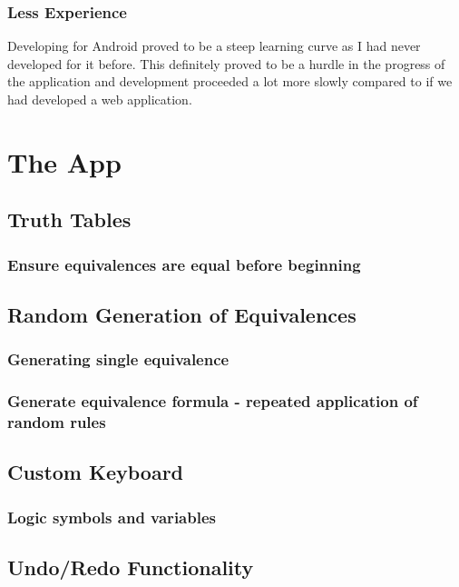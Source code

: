 \documentclass{report}
\begin{document}
\subsection{Less Experience}

Developing for Android proved to be a steep learning curve as I had never developed for it before. This definitely proved to be a hurdle in the progress of the application and development proceeded a lot more slowly compared to if we had developed a web application.

\chapter{The App}
\section{Truth Tables}
\label{sec:app_truth_tables}

\subsection{Ensure equivalences are equal before beginning}

\section{Random Generation of Equivalences}
\subsection{Generating single equivalence}
\subsection{Generate equivalence formula - repeated application of random rules}

\section{Custom Keyboard}
\label{sec:custom_keyboard}

\subsection{Logic symbols and variables}

\section{Undo/Redo Functionality}
\end{document}
